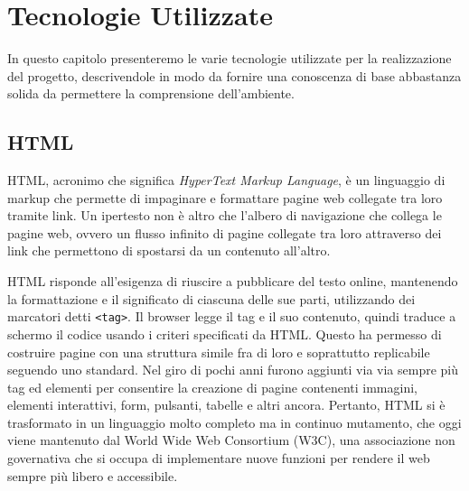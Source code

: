\clearpage{\pagestyle{empty}\cleardoublepage}
\chapter{Tecnologie Utilizzate}
In questo capitolo presenteremo le varie tecnologie utilizzate per la realizzazione del progetto, descrivendole in modo da fornire una conoscenza di base abbastanza solida da permettere la comprensione dell'ambiente.

\section{HTML}
HTML, acronimo che significa \textit{HyperText Markup Language}, è un linguaggio di markup che permette di impaginare e formattare pagine web collegate tra loro tramite link. Un ipertesto non è altro che l'albero di navigazione che collega le pagine web, ovvero un flusso infinito di pagine collegate tra loro attraverso dei link che permettono di spostarsi da un contenuto all'altro.

HTML risponde all'esigenza di riuscire a pubblicare del testo online, mantenendo la formattazione e il significato di ciascuna delle sue parti, utilizzando dei marcatori detti \Verb_<tag>_. Il browser legge il tag e il suo contenuto, quindi traduce a schermo il codice usando i criteri specificati da HTML. Questo ha permesso di costruire pagine con  una struttura simile fra di loro e soprattutto replicabile seguendo uno standard. Nel giro di pochi anni furono aggiunti via via sempre più tag ed elementi per consentire la creazione di pagine contenenti immagini, elementi interattivi, form, pulsanti, tabelle e altri ancora. Pertanto, HTML si è trasformato in un linguaggio molto completo ma in continuo mutamento, che oggi viene mantenuto dal World Wide Web Consortium (W3C), una associazione non governativa che si occupa di implementare nuove funzioni per rendere il web sempre più libero e accessibile.

